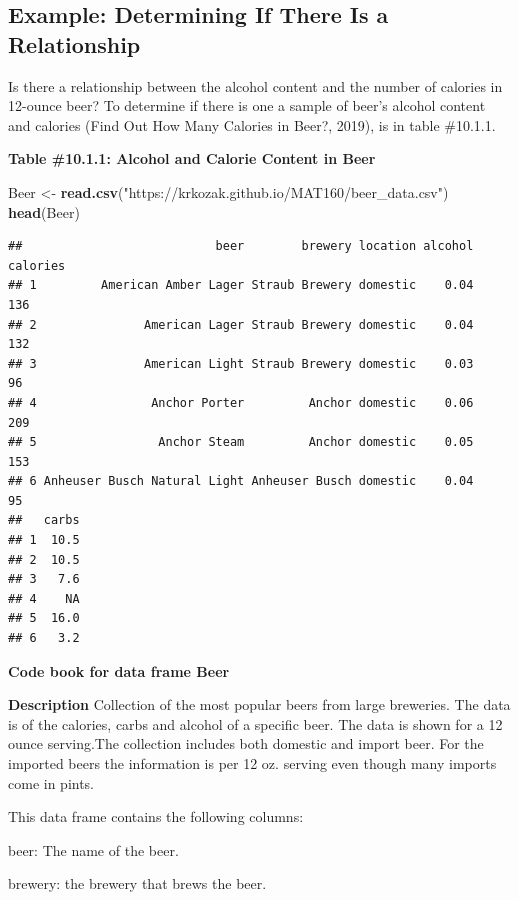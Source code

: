 \documentclass[]{book}
\newenvironment{Shaded}{\begin{snugshade}}{\end{snugshade}}
\newcommand{\KeywordTok}[1]{\textcolor[rgb]{0.13,0.29,0.53}{\textbf{#1}}}
\newcommand{\NormalTok}[1]{#1}
\newcommand{\StringTok}[1]{\textcolor[rgb]{0.31,0.60,0.02}{#1}}
\begin{document}
\hypertarget{example-determining-if-there-is-a-relationship}{%
\subsection{Example: Determining If There Is a Relationship}\label{example-determining-if-there-is-a-relationship}}

Is there a relationship between the alcohol content and the number of calories in 12-ounce beer? To determine if there is one a sample of beer's alcohol content and calories (Find Out How Many Calories in Beer?, 2019), is in table \#10.1.1.

\textbf{Table \#10.1.1: Alcohol and Calorie Content in Beer}

\begin{Shaded}
\begin{Highlighting}[]
\NormalTok{Beer <-}\StringTok{ }\KeywordTok{read.csv}\NormalTok{(}\StringTok{"https://krkozak.github.io/MAT160/beer_data.csv"}\NormalTok{)}
\KeywordTok{head}\NormalTok{(Beer)}
\end{Highlighting}
\end{Shaded}

\begin{verbatim}
##                           beer        brewery location alcohol calories
## 1         American Amber Lager Straub Brewery domestic    0.04      136
## 2               American Lager Straub Brewery domestic    0.04      132
## 3               American Light Straub Brewery domestic    0.03       96
## 4                Anchor Porter         Anchor domestic    0.06      209
## 5                 Anchor Steam         Anchor domestic    0.05      153
## 6 Anheuser Busch Natural Light Anheuser Busch domestic    0.04       95
##   carbs
## 1  10.5
## 2  10.5
## 3   7.6
## 4    NA
## 5  16.0
## 6   3.2
\end{verbatim}

\textbf{Code book for data frame Beer}

\textbf{Description}
Collection of the most popular beers from large breweries. The data is of the calories, carbs and alcohol of a specific beer. The data is shown for a 12 ounce serving.The collection includes both domestic and import beer. For the imported beers the information is per 12 oz. serving even though many imports come in pints.

This data frame contains the following columns:

beer: The name of the beer.

brewery: the brewery that brews the beer.
\end{document}
